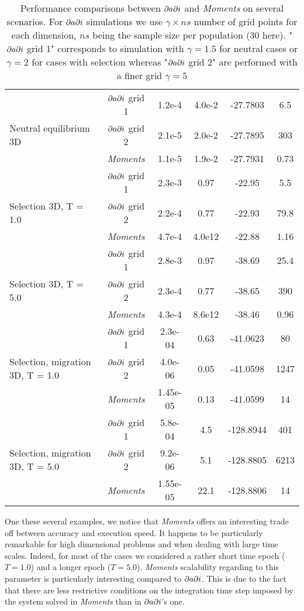\begin{table}[h!]
\begin{scriptsize}
\begin{tabular}{l|c|*{4}{c}}
 				   & $\partial a \partial i$ grid 1 & 1.2e-4 & 4.0e-2 & -27.7803 & 6.5  \\
Neutral equilibrium 3D & $\partial a \partial i$ grid 2 & 2.1e-5 & 2.0e-2 & -27.7895 &  303 \\
 				   & \textit{Moments} & 1.1e-5 & 1.9e-2 & -27.7931 & 0.73  \\
\hline
 				   & $\partial a \partial i$ grid 1 & 2.3e-3 & 0.97 & -22.95 & 5.5  \\
Selection 3D, T = 1.0   & $\partial a \partial i$ grid 2 & 2.2e-4 & 0.77 & -22.93 & 79.8  \\
 				   & \textit{Moments} & 4.7e-4 & 4.0e12 & -22.88 & 1.16  \\
\hline
 				   & $\partial a \partial i$ grid 1 & 2.8e-3 & 0.97 & -38.69 & 25.4 \\
Selection 3D, T = 5.0   & $\partial a \partial i$ grid 2 & 2.3e-4 & 0.77 & -38.65 &  390 \\
 				   & \textit{Moments} & 4.3e-4 & 8.6e12 & -38.46 & 0.96  \\
\hline
 				   		   & $\partial a \partial i$ grid 1 & 2.3e-04 & 0.63 & -41.0623 & 80  \\
Selection, migration 3D, T = 1.0   & $\partial a \partial i$ grid 2 & 4.0e-06 & 0.05 & -41.0598 & 1247  \\
 				   		   & \textit{Moments} & 1.45e-05 & 0.13 & -41.0599 & 14  \\
\hline
 				   		   & $\partial a \partial i$ grid 1 & 5.8e-04 & 4.5 & -128.8944 & 401  \\
Selection, migration 3D, T = 5.0   & $\partial a \partial i$ grid 2 & 9.2e-06 & 5.1 & -128.8805 & 6213  \\
 				   		   & \textit{Moments} & 1.55e-05 & 22.1 & -128.8806 & 14  \\
\hline
\end{tabular}
\end{scriptsize}
\caption{Performance comparisons between $\partial a \partial i$ and \textit{Moments} on several scenarios. For $\partial a \partial i$ simulations we use $\gamma \times ns$ number of grid points for each dimension, $ns$ being the sample size per population (30 here).  "$\partial a \partial i$ grid 1" corresponds to  simulation with $\gamma=1.5$ for neutral cases or $\gamma=2$ for cases with selection whereas "$\partial a \partial i$ grid 2" are performed with a finer grid $\gamma=5$}
\end{table}

One these several examples, we notice that \textit{Moments} offers an interesting trade off between accuracy and execution speed. It happens to be particularly remarkable for high dimensional problems and when dealing with large time scales. Indeed, for most of the cases we considered a rather short time epoch ($T=1.0$) and a longer epoch ($T=5.0$). \textit{Moments} scalability regarding to this parameter is particularly interesting compared to $\partial a \partial i$. This is due to the fact that there are less restrictive conditions on the integration time step imposed by the system solved in \textit{Moments} than in $\partial a \partial i$'s one.

